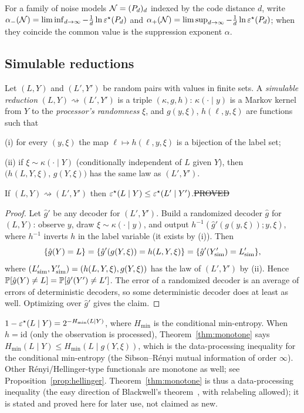 For a family of noise models $\mathcal{N}=(P_d)_{d}$ indexed by the code distance $d$, write
$\alpha_-(\mathcal{N})=\liminf_{d\to\infty}-\tfrac1d\ln\varepsilon^{\star}(P_d)$ and $\alpha_+(\mathcal{N})=\limsup_{d\to\infty}-\tfrac1d\ln\varepsilon^{\star}(P_d)$;
when they coincide the common value is the suppression exponent $\alpha$.

\subsection{Simulable reductions}

\begin{definition}\label{def:reduction}
Let $(L,Y)$ and $(L',Y')$ be random pairs with values in finite sets. A \emph{simulable reduction}
$(L,Y)\rightsquigarrow(L',Y')$ is a triple $(\kappa,g,h)$:
$\kappa(\cdot\mid y)$ is a Markov kernel from $Y$ to the \emph{processor's randomness} $\xi$, and $g(y,\xi)$, $h(\ell,y,\xi)$ are functions such that

\smallskip
(i) for every $(y,\xi)$ the map $\ell\mapsto h(\ell,y,\xi)$ is a bijection of the label set;

(ii) if $\xi\sim\kappa(\cdot\mid Y)$ (conditionally independent of $L$ given $Y$), then
$\big(h(L,Y,\xi),\,g(Y,\xi)\big)$ has the same law as $(L',Y')$.
\end{definition}

\begin{theorem}[Monotonicity]\label{thm:monotone}
If $(L,Y)\rightsquigarrow(L',Y')$ then $\varepsilon^{\star}(L\mid Y)\le\varepsilon^{\star}(L'\mid Y')$.\hfill\st{PROVED}
\end{theorem}
\begin{proof}
Let $\hat g'$ be any decoder for $(L',Y')$. Build a randomized decoder $\hat g$ for $(L,Y)$:
observe $y$, draw $\xi\sim\kappa(\cdot\mid y)$, and output $h^{-1}(\hat g'(g(y,\xi));y,\xi)$, where $h^{-1}$ inverts $h$ in the label variable (it exists by (i)).
Then
\[
\{\hat g(Y)=L\}=\{\hat g'(g(Y,\xi))=h(L,Y,\xi)\}=\{\hat g'(Y'_{\rm sim})=L'_{\rm sim}\},
\]
where $(L'_{\rm sim},Y'_{\rm sim})=(h(L,Y,\xi),g(Y,\xi))$ has the law of $(L',Y')$ by (ii). Hence
$\mathbb{P}[\hat g(Y)\neq L]=\mathbb{P}[\hat g'(Y')\neq L']$. The error of a randomized decoder is an average of errors of deterministic decoders,
so some deterministic decoder does at least as well. Optimizing over $\hat g'$ gives the claim.
\end{proof}

\begin{remark}
$1-\varepsilon^{\star}(L\mid Y)=2^{-H_{\min}(L\mid Y)}$, where $H_{\min}$ is the conditional min-entropy. When $h=\mathrm{id}$
(only the observation is processed), Theorem~\ref{thm:monotone} says $H_{\min}(L\mid Y)\le H_{\min}(L\mid g(Y,\xi))$,
which is the data-processing inequality for the conditional min-entropy (the Sibson--R\'enyi mutual information of order $\infty$). Other R\'enyi/Hellinger-type functionals are
monotone as well; see Proposition~\ref{prop:hellinger}.
Theorem~\ref{thm:monotone} is thus a data-processing inequality (the easy direction of Blackwell's theorem~\cite{Blackwell}, with relabeling allowed); it is stated and proved here for later use, not claimed as new.
\end{remark}

